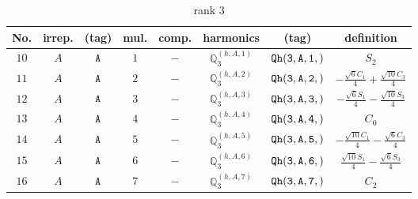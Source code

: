 \documentclass[fleqn,8pt]{jsarticle}
\begin{document}
\begin{table}[ht!]
\begin{center}
\caption{rank 3}
\renewcommand{\arraystretch}{1.3}
\begin{tabular}{cccccccc} \hline \hline
No. & irrep. & (tag) & mul. & comp. & harmonics & (tag) & definition \\ \hline
$ 10 $ & $ A $ & $ {\tt A} $ & $ 1 $ & $ - $ & $ \mathbb{Q}_{3}^{(h,A,1)} $ & $ {\tt Qh(3,A,1,)} $ & $ S_{2} $ \\
$ 11 $ & $ A $ & $ {\tt A} $ & $ 2 $ & $ - $ & $ \mathbb{Q}_{3}^{(h,A,2)} $ & $ {\tt Qh(3,A,2,)} $ & $ - \frac{\sqrt{6} C_{1}}{4} + \frac{\sqrt{10} C_{3}}{4} $ \\
$ 12 $ & $ A $ & $ {\tt A} $ & $ 3 $ & $ - $ & $ \mathbb{Q}_{3}^{(h,A,3)} $ & $ {\tt Qh(3,A,3,)} $ & $ - \frac{\sqrt{6} S_{1}}{4} - \frac{\sqrt{10} S_{3}}{4} $ \\
$ 13 $ & $ A $ & $ {\tt A} $ & $ 4 $ & $ - $ & $ \mathbb{Q}_{3}^{(h,A,4)} $ & $ {\tt Qh(3,A,4,)} $ & $ C_{0} $ \\
$ 14 $ & $ A $ & $ {\tt A} $ & $ 5 $ & $ - $ & $ \mathbb{Q}_{3}^{(h,A,5)} $ & $ {\tt Qh(3,A,5,)} $ & $ - \frac{\sqrt{10} C_{1}}{4} - \frac{\sqrt{6} C_{3}}{4} $ \\
$ 15 $ & $ A $ & $ {\tt A} $ & $ 6 $ & $ - $ & $ \mathbb{Q}_{3}^{(h,A,6)} $ & $ {\tt Qh(3,A,6,)} $ & $ \frac{\sqrt{10} S_{1}}{4} - \frac{\sqrt{6} S_{3}}{4} $ \\
$ 16 $ & $ A $ & $ {\tt A} $ & $ 7 $ & $ - $ & $ \mathbb{Q}_{3}^{(h,A,7)} $ & $ {\tt Qh(3,A,7,)} $ & $ C_{2} $ \\
 \hline \hline
\end{tabular}
\end{center}
\end{table}
\end{document}
